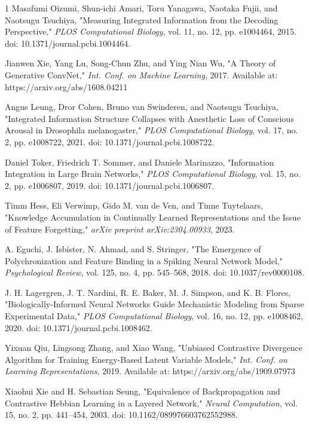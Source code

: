 \documentclass{article}
\begin{document}
\begin{thebibliography}{1}
 Masafumi Oizumi, Shun-ichi Amari, Toru Yanagawa, Naotaka Fujii, and Naotsugu Tsuchiya, "Measuring Integrated Information from the Decoding Perspective," \textit{PLOS Computational Biology}, vol. 11, no. 12, pp. e1004464, 2015. doi: 10.1371/journal.pcbi.1004464.

 Jianwen Xie, Yang Lu, Song-Chun Zhu, and Ying Nian Wu, "A Theory of Generative ConvNet," \textit{Int. Conf. on Machine Learning}, 2017. Available at: https://arxiv.org/abs/1608.04211

 Angus Leung, Dror Cohen, Bruno van Swinderen, and Naotsugu Tsuchiya, "Integrated Information Structure Collapses with Anesthetic Loss of Conscious Arousal in Drosophila melanogaster," \textit{PLOS Computational Biology}, vol. 17, no. 2, pp. e1008722, 2021. doi: 10.1371/journal.pcbi.1008722.

 Daniel Toker, Friedrich T. Sommer, and Daniele Marinazzo, "Information Integration in Large Brain Networks," \textit{PLOS Computational Biology}, vol. 15, no. 2, pp. e1006807, 2019. doi: 10.1371/journal.pcbi.1006807.

 Timm Hess, Eli Verwimp, Gido M. van de Ven, and Tinne Tuytelaars, "Knowledge Accumulation in Continually Learned Representations and the Issue of Feature Forgetting," \textit{arXiv preprint arXiv:2304.00933}, 2023.

 A. Eguchi, J. Isbister, N. Ahmad, and S. Stringer, "The Emergence of Polychronization and Feature Binding in a Spiking Neural Network Model," \textit{Psychological Review}, vol. 125, no. 4, pp. 545--568, 2018. doi: 10.1037/rev0000108.

 J. H. Lagergren, J. T. Nardini, R. E. Baker, M. J. Simpson, and K. B. Flores, "Biologically-Informed Neural Networks Guide Mechanistic Modeling from Sparse Experimental Data," \textit{PLOS Computational Biology}, vol. 16, no. 12, pp. e1008462, 2020. doi: 10.1371/journal.pcbi.1008462.

 Yixuan Qiu, Lingsong Zhang, and Xiao Wang, "Unbiased Contrastive Divergence Algorithm for Training Energy-Based Latent Variable Models," \textit{Int. Conf. on Learning Representations}, 2019. Available at: https://arxiv.org/abs/1909.07973

 Xiaohui Xie and H. Sebastian Seung, "Equivalence of Backpropagation and Contrastive Hebbian Learning in a Layered Network," \textit{Neural Computation}, vol. 15, no. 2, pp. 441--454, 2003. doi: 10.1162/089976603762552988.


\end{thebibliography}
\end{document}
